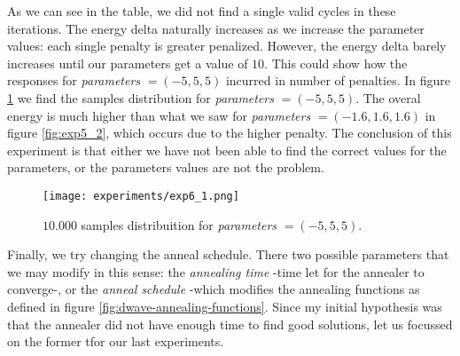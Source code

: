 \begin{table}[H]
	\centering
	\caption{Results of experiment 6, $10.000$ reads using the quantum annealer for different parameters configurations.}
	\label{tab:exp6_1}
\end{table}

As we can see in the table, we did not find a single valid cycles in these iterations. The energy delta naturally increases as we increase the parameter values: each single penalty is greater penalized. However, the energy delta barely increases until our parameters get a value of $10$. This could show how the responses for \emph{parameters} $= (-5, 5, 5)$ incurred in number of penalties. In figure \ref{fig:exp6_1} we find the samples distribution for \emph{parameters} $= (-5, 5, 5)$. The overal energy is much higher than what we saw for \emph{parameters} $= (-1.6, 1.6, 1.6)$ in figure \ref{fig:exp5_2}, which occurs due to the higher penalty. The conclusion of this experiment is that either we have not been able to find the correct values for the parameters, or the parameters values are not the problem.

\begin{figure}[H]
	\texttt{[image: experiments/exp6\_1.png]}
	\centering
	\caption{$10.000$ samples distribuition for \emph{parameters} $= (-5, 5, 5)$.}
	\label{fig:exp6_1}
\end{figure}

Finally, we try changing the anneal schedule. There two possible parameters that we may modify in this sense: the \emph{annealing time} -time let for the annealer to converge-, or the \emph{anneal schedule} -which modifies the annealing functions as defined in figure \ref{fig:dwave-annealing-functions}. Since my initial hypothesis was that the annealer did not have enough time to find good solutions, let us focussed on the former tfor our last experiments.


